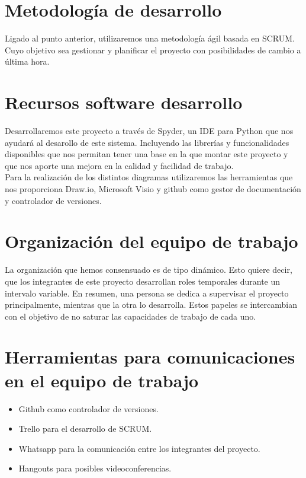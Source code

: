 \section{Metodología de desarrollo}

Ligado al punto anterior, utilizaremos una metodología ágil basada en SCRUM. Cuyo objetivo sea gestionar y planificar el proyecto con posibilidades de cambio a última hora. 

\section{Recursos software desarrollo}

Desarrollaremos este proyecto a través de Spyder, un IDE para Python que nos ayudará al desarollo de este sistema. Incluyendo las librerías y funcionalidades disponibles que nos permitan tener una base en la que montar este proyecto y que nos aporte una mejora en la calidad y facilidad de trabajo. \\

Para la realización de los distintos diagramas utilizaremos las herramientas que nos proporciona Draw.io, Microsoft Visio y github como gestor de documentación y controlador de versiones.

\section{Organización del equipo de trabajo}

La organización que hemos consensuado es de tipo dinámico. Esto quiere decir, que los integrantes de este proyecto desarrollan roles temporales durante un intervalo variable. En resumen, una persona se dedica a supervisar el proyecto principalmente, mientras que la otra lo desarrolla. Estos papeles se intercambian con el objetivo de no saturar las capacidades de trabajo de cada uno.

\section{Herramientas para comunicaciones en el equipo de trabajo}

\begin{itemize}
	\item Github como controlador de versiones.
	\item Trello para el desarrollo de SCRUM.
	\item Whatsapp para la comunicación entre los integrantes del proyecto.
	\item Hangouts para posibles videoconferencias.
\end{itemize}

